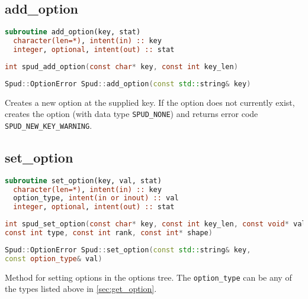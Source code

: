 \documentclass[a4paper, 11pt]{book}
\begin{document}
\subsection{add\_option}

\begin{lstlisting}[language=fortran]
subroutine add_option(key, stat)
  character(len=*), intent(in) :: key
  integer, optional, intent(out) :: stat
\end{lstlisting}

\begin{lstlisting}[language=C]
int spud_add_option(const char* key, const int key_len)
\end{lstlisting}

\begin{lstlisting}[language=C++]
Spud::OptionError Spud::add_option(const std::string& key)
\end{lstlisting}

Creates a new option at the supplied key. If the option does not currently
exist, creates the option (with data type \lstinline+SPUD_NONE+) and
returns error code \lstinline+SPUD_NEW_KEY_WARNING+.

\subsection{set\_option}\label{sec:set_option}

\begin{lstlisting}[language=fortran,emph=option_type,emphstyle=\textit]
subroutine set_option(key, val, stat)
  character(len=*), intent(in) :: key
  option_type, intent(in or inout) :: val
  integer, optional, intent(out) :: stat
\end{lstlisting}

\begin{lstlisting}[language=C,emph=option_type,emphstyle=\textit]
int spud_set_option(const char* key, const int key_len, const void* val,
const int type, const int rank, const int* shape)
\end{lstlisting}

\begin{lstlisting}[language=C++,emph=option_type,emphstyle=\textit]
Spud::OptionError Spud::set_option(const std::string& key,
const option_type& val)
\end{lstlisting}

Method for setting options in the options tree. The
\lstinline[emph=option_type,emphstyle=\textit]+option_type+ can be any of the
types listed above in \ref{sec:get_option}.
\end{document}
